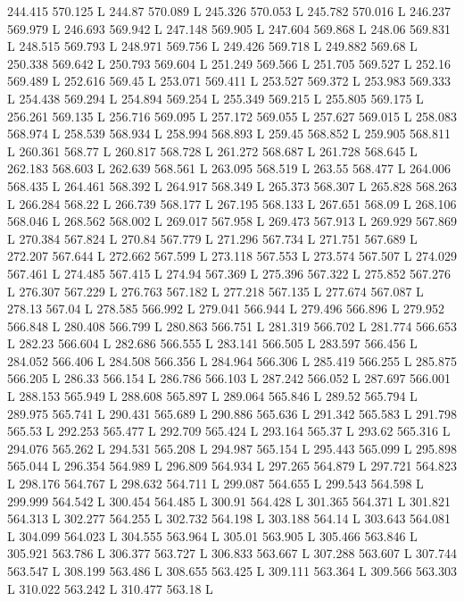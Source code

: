 244.415 570.125 L
244.87 570.089 L
245.326 570.053 L
245.782 570.016 L
246.237 569.979 L
246.693 569.942 L
247.148 569.905 L
247.604 569.868 L
248.06 569.831 L
248.515 569.793 L
248.971 569.756 L
249.426 569.718 L
249.882 569.68 L
250.338 569.642 L
250.793 569.604 L
251.249 569.566 L
251.705 569.527 L
252.16 569.489 L
252.616 569.45 L
253.071 569.411 L
253.527 569.372 L
253.983 569.333 L
254.438 569.294 L
254.894 569.254 L
255.349 569.215 L
255.805 569.175 L
256.261 569.135 L
256.716 569.095 L
257.172 569.055 L
257.627 569.015 L
258.083 568.974 L
258.539 568.934 L
258.994 568.893 L
259.45 568.852 L
259.905 568.811 L
260.361 568.77 L
260.817 568.728 L
261.272 568.687 L
261.728 568.645 L
262.183 568.603 L
262.639 568.561 L
263.095 568.519 L
263.55 568.477 L
264.006 568.435 L
264.461 568.392 L
264.917 568.349 L
265.373 568.307 L
265.828 568.263 L
266.284 568.22 L
266.739 568.177 L
267.195 568.133 L
267.651 568.09 L
268.106 568.046 L
268.562 568.002 L
269.017 567.958 L
269.473 567.913 L
269.929 567.869 L
270.384 567.824 L
270.84 567.779 L
271.296 567.734 L
271.751 567.689 L
272.207 567.644 L
272.662 567.599 L
273.118 567.553 L
273.574 567.507 L
274.029 567.461 L
274.485 567.415 L
274.94 567.369 L
275.396 567.322 L
275.852 567.276 L
276.307 567.229 L
276.763 567.182 L
277.218 567.135 L
277.674 567.087 L
278.13 567.04 L
278.585 566.992 L
279.041 566.944 L
279.496 566.896 L
279.952 566.848 L
280.408 566.799 L
280.863 566.751 L
281.319 566.702 L
281.774 566.653 L
282.23 566.604 L
282.686 566.555 L
283.141 566.505 L
283.597 566.456 L
284.052 566.406 L
284.508 566.356 L
284.964 566.306 L
285.419 566.255 L
285.875 566.205 L
286.33 566.154 L
286.786 566.103 L
287.242 566.052 L
287.697 566.001 L
288.153 565.949 L
288.608 565.897 L
289.064 565.846 L
289.52 565.794 L
289.975 565.741 L
290.431 565.689 L
290.886 565.636 L
291.342 565.583 L
291.798 565.53 L
292.253 565.477 L
292.709 565.424 L
293.164 565.37 L
293.62 565.316 L
294.076 565.262 L
294.531 565.208 L
294.987 565.154 L
295.443 565.099 L
295.898 565.044 L
296.354 564.989 L
296.809 564.934 L
297.265 564.879 L
297.721 564.823 L
298.176 564.767 L
298.632 564.711 L
299.087 564.655 L
299.543 564.598 L
299.999 564.542 L
300.454 564.485 L
300.91 564.428 L
301.365 564.371 L
301.821 564.313 L
302.277 564.255 L
302.732 564.198 L
303.188 564.14 L
303.643 564.081 L
304.099 564.023 L
304.555 563.964 L
305.01 563.905 L
305.466 563.846 L
305.921 563.786 L
306.377 563.727 L
306.833 563.667 L
307.288 563.607 L
307.744 563.547 L
308.199 563.486 L
308.655 563.425 L
309.111 563.364 L
309.566 563.303 L
310.022 563.242 L
310.477 563.18 L
